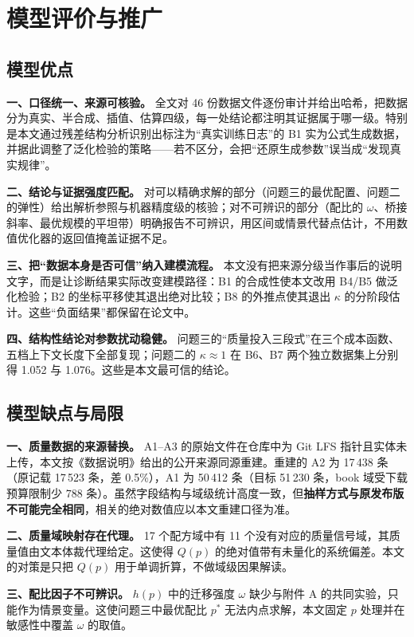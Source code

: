\section{模型评价与推广}

\subsection{模型优点}

\textbf{一、口径统一、来源可核验。} 全文对 46 份数据文件逐份审计并给出哈希，把数据分为真实、半合成、插值、估算四级，每一处结论都注明其证据属于哪一级。特别是本文通过残差结构分析识别出标注为``真实训练日志''的 B1 实为公式生成数据，并据此调整了泛化检验的策略——若不区分，会把``还原生成参数''误当成``发现真实规律''。

\textbf{二、结论与证据强度匹配。} 对可以精确求解的部分（问题三的最优配置、问题二的弹性）给出解析参照与机器精度级的核验；对不可辨识的部分（配比的 $\omega$、桥接斜率、最优规模的平坦带）明确报告不可辨识，用区间或情景代替点估计，不用数值优化器的返回值掩盖证据不足。

\textbf{三、把``数据本身是否可信''纳入建模流程。} 本文没有把来源分级当作事后的说明文字，而是让诊断结果实际改变建模路径：B1 的合成性使本文改用 B4/B5 做泛化检验；B2 的坐标平移使其退出绝对比较；B8 的外推点使其退出 $\kappa$ 的分阶段估计。这些``负面结果''都保留在论文中。

\textbf{四、结构性结论对参数扰动稳健。} 问题三的``质量投入三段式''在三个成本函数、五档上下文长度下全部复现；问题二的 $\kappa\approx1$ 在 B6、B7 两个独立数据集上分别得 1.052 与 1.076。这些是本文最可信的结论。

\subsection{模型缺点与局限}

\textbf{一、质量数据的来源替换。} A1--A3 的原始文件在仓库中为 Git LFS 指针且实体未上传，本文按《数据说明》给出的公开来源同源重建。重建的 A2 为 17\,438 条（原记载 17\,523 条，差 0.5\%），A1 为 50\,412 条（目标 51\,230 条，book 域受下载预算限制少 788 条）。虽然字段结构与域级统计高度一致，但\textbf{抽样方式与原发布版不可能完全相同}，相关的绝对数值应以本文重建口径为准。

\textbf{二、质量域映射存在代理。} 17 个配方域中有 11 个没有对应的质量信号域，其质量值由文本体裁代理给定。这使得 $Q(p)$ 的绝对值带有未量化的系统偏差。本文的对策是只把 $Q(p)$ 用于单调折算，不做域级因果解读。

\textbf{三、配比因子不可辨识。} $h(p)$ 中的迁移强度 $\omega$ 缺少与附件 A 的共同实验，只能作为情景变量。这使问题三中最优配比 $p^\ast$ 无法内点求解，本文固定 $p$ 处理并在敏感性中覆盖 $\omega$ 的取值。

